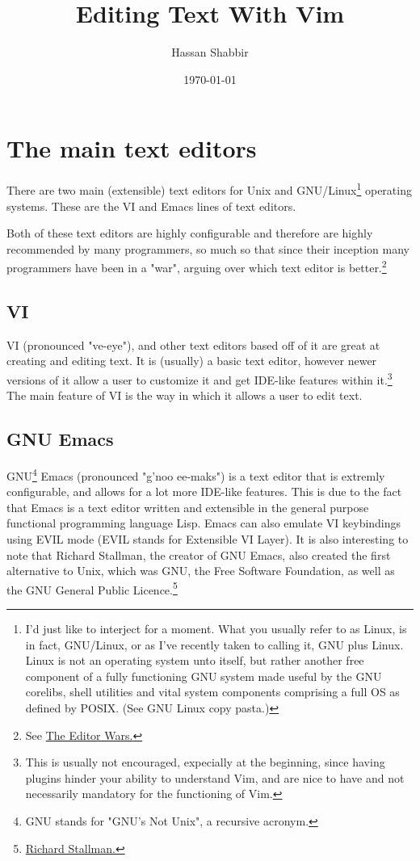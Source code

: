 \documentclass[11pt]{article}
\author{Hassan Shabbir}
\date{\today}
\title{Editing Text With Vim}
\begin{document}
\maketitle
\tableofcontents

\newpage

\section{The main text editors}
\label{sec:org1183b8f}
There are two main (extensible) text editors for Unix and GNU/Linux\footnote{I'd just like to interject for a moment. What you usually refer to as Linux, is
in fact, GNU/Linux, or as I've recently taken to calling it, GNU plus Linux.
Linux is not an operating system unto itself, but rather another free component
of a fully functioning GNU system made useful by the GNU corelibs, shell
utilities and vital system components comprising a full OS as defined by POSIX.
(See GNU Linux copy pasta.)}
operating systems. These are the VI and Emacs lines of text editors.

Both of these text editors are highly configurable and therefore are highly
recommended by many programmers, so much so that since their inception many
programmers have been in a "war", arguing over which text editor is
better.\footnote{See \href{https://en.wikipedia.org/wiki/Editor\_war}{The Editor Wars.}}
\subsection{VI}
\label{sec:orgbc91eb5}
VI (pronounced "ve-eye"), and other text editors based off of it are great at
creating and editing text. It is (usually) a basic text editor, however newer
versions of it allow a user to customize it and get IDE-like features within
it.\footnote{This is usually not encouraged, expecially at the beginning, since
having plugins hinder your ability to understand Vim, and are nice to have
and not necessarily mandatory for the functioning of Vim.} The main feature of VI is the way in which it allows a user to edit
text.
\subsection{GNU Emacs}
\label{sec:orgcb42bc6}
GNU\footnote{GNU stands for "GNU's Not Unix", a recursive acronym.} Emacs (pronounced "g'noo ee-maks") is a text editor that is extremly
configurable, and allows for a lot more IDE-like features. This is due to the
fact that Emacs is a text editor written and extensible in the general purpose
functional programming language Lisp. Emacs can also emulate VI keybindings
using EVIL mode (EVIL stands for Extensible VI Layer). It is also interesting to
note that Richard Stallman, the creator of GNU Emacs, also created the first
alternative to Unix, which was GNU, the Free Software Foundation, as well as the
GNU General Public Licence.\footnote{\href{https://en.wikipedia.org/wiki/Richard\_Stallman}{Richard Stallman.}}
\end{document}
